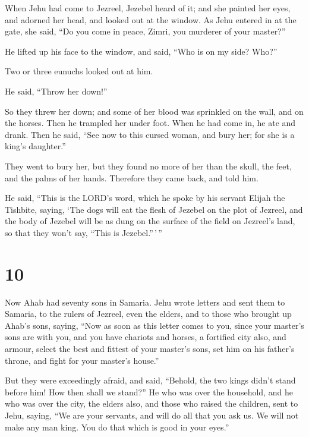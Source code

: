  When Jehu had come to Jezreel, Jezebel heard of it; and
she painted her eyes, and adorned her head, and looked out at the
window.  As Jehu entered in at the gate, she said, ``Do
you come in peace, Zimri, you murderer of your master?''

 He lifted up his face to the window, and said, ``Who is
on my side? Who?''

Two or three eunuchs looked out at him.

 He said, ``Throw her down!''

So they threw her down; and some of her blood was sprinkled on the wall,
and on the horses. Then he trampled her under foot.  When
he had come in, he ate and drank. Then he said, ``See now to this cursed
woman, and bury her; for she is a king's daughter.''

 They went to bury her, but they found no more of her
than the skull, the feet, and the palms of her hands. 
Therefore they came back, and told him.

He said, ``This is the LORD's word, which he spoke by his servant Elijah
the Tishbite, saying, `The dogs will eat the flesh of Jezebel on the
plot of Jezreel,  and the body of Jezebel will be as dung
on the surface of the field on Jezreel's land, so that they won't say,
``This is Jezebel.''\,'\,''

\hypertarget{section-9}{%
\section{10}\label{section-9}}

 Now Ahab had seventy sons in Samaria. Jehu wrote letters
and sent them to Samaria, to the rulers of Jezreel, even the elders, and
to those who brought up Ahab's sons, saying,  ``Now as
soon as this letter comes to you, since your master's sons are with you,
and you have chariots and horses, a fortified city also, and armour,
 select the best and fittest of your master's sons, set
him on his father's throne, and fight for your master's house.''

 But they were exceedingly afraid, and said, ``Behold, the
two kings didn't stand before him! How then shall we stand?''
 He who was over the household, and he who was over the
city, the elders also, and those who raised the children, sent to Jehu,
saying, ``We are your servants, and will do all that you ask us. We will
not make any man king. You do that which is good in your eyes.''

